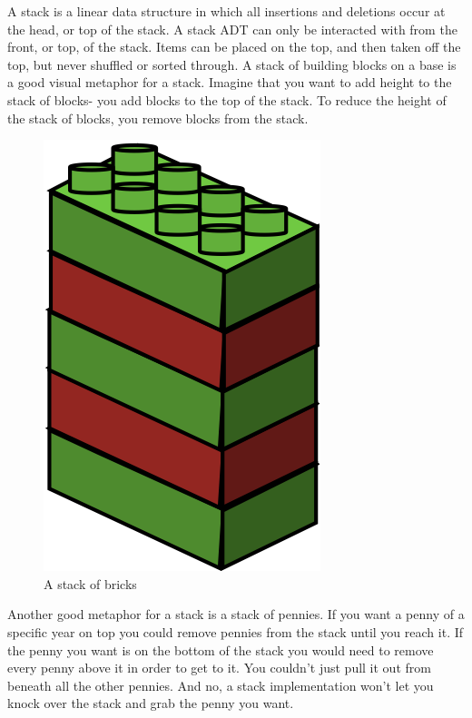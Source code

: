     A stack is a linear data structure  in which all insertions and
deletions occur at the head, or top of the stack. A stack ADT can only be
interacted with from the front, or top, of the stack. Items can be placed
on the top, and then taken off the top, but never shuffled or sorted
through. A stack of building blocks on a base is a good visual metaphor for
a stack. Imagine that you want to add height to the stack of blocks- you
 add blocks to the top of the stack. To reduce the height of the
stack of blocks, you  remove blocks from the stack.


\begin{figure}[H]
\centering
\includegraphics{pictures/stackofbricks.png}
\caption{A stack of bricks}
\label{fig:lego}
\end{figure}



Another good metaphor for a stack is a stack of pennies. If you want a penny of a specific year on top you could remove pennies from the stack until you reach it. If the penny you want is on the bottom of the stack you would need to remove every penny above it in order to get to it. You couldn’t just pull it out from beneath all the other pennies. And no, a stack implementation won’t let you knock over the stack and grab the penny you want.


